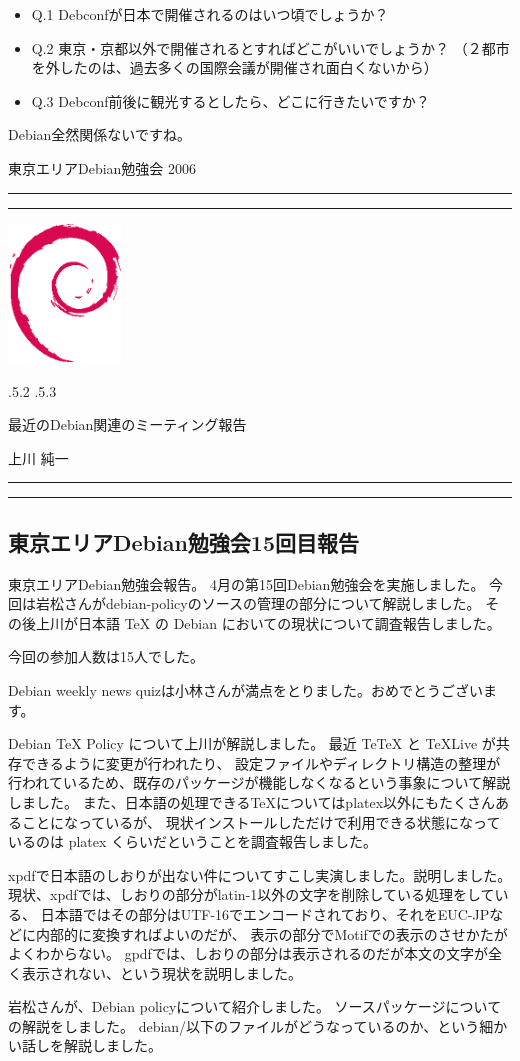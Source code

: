 \documentclass[mingoth,a4paper]{jsarticle}
\makeatletter
\renewcommand{\section}{\@startsection{section}{1}{\z@}%
    {\Cvs \@plus.5\Cdp \@minus.2\Cdp}%
    {.5\Cvs \@plus.3\Cdp}%
    {\normalfont\Large\headfont\raggedright\centering}} %
\newcommand{\dancersection}[2]{%
\newpage
東京エリアDebian勉強会 2006
\hrule
\vspace{0.5mm}
\hrule
\hfill{}\includegraphics[width=3cm]{image200502/openlogo-nd.eps}\\
\vspace{-4cm}
\begin{center}
  \section{#1}
\end{center}
\hfill{}#2\hspace{3cm}\space\\
\hrule
\hrule
\vspace{1cm}
}
\makeatother
\begin{document}
\begin{itemize}
 \item  Q.1 Debconfが日本で開催されるのはいつ頃でしょうか？
 \item  Q.2 東京・京都以外で開催されるとすればどこがいいでしょうか？
 （２都市を外したのは、過去多くの国際会議が開催され面白くないから）
 \item  Q.3 Debconf前後に観光するとしたら、どこに行きたいですか？
\end{itemize}

Debian全然関係ないですね。


\dancersection{最近のDebian関連のミーティング報告}{上川 純一}

\subsection{東京エリアDebian勉強会15回目報告}
	  東京エリアDebian勉強会報告。
	  4月の第15回Debian勉強会を実施しました。
	    今回は岩松さんがdebian-policyのソースの管理の部分について解説しました。
	    その後上川が日本語 TeX の Debian においての現状について調査報告しました。
	  
	  今回の参加人数は15人でした。
        
	
	  
	    Debian weekly news quizは小林さんが満点をとりました。おめでとうございます。
	  
	  
	    Debian TeX Policy について上川が解説しました。
	    最近 TeTeX と TeXLive が共存できるように変更が行われたり、
	    設定ファイルやディレクトリ構造の整理が行われているため、既存のパッケージが機能しなくなるという事象について解説しました。
	    また、日本語の処理できるTeXについてはplatex以外にもたくさんあることになっているが、
	    現状インストールしただけで利用できる状態になっているのは platex くらいだということを調査報告しました。
	  
	  
	    xpdfで日本語のしおりが出ない件についてすこし実演しました。説明しました。
	    現状、xpdfでは、しおりの部分がlatin-1以外の文字を削除している処理をしている、
	    日本語ではその部分はUTF-16でエンコードされており、それをEUC-JPなどに内部的に変換すればよいのだが、
	    表示の部分でMotifでの表示のさせかたがよくわからない。
	    gpdfでは、しおりの部分は表示されるのだが本文の文字が全く表示されない、という現状を説明しました。
	  
	  
	    岩松さんが、Debian policyについて紹介しました。
	    ソースパッケージについての解説をしました。
	    debian/以下のファイルがどうなっているのか、という細かい話しを解説しました。
	  
\end{document}
